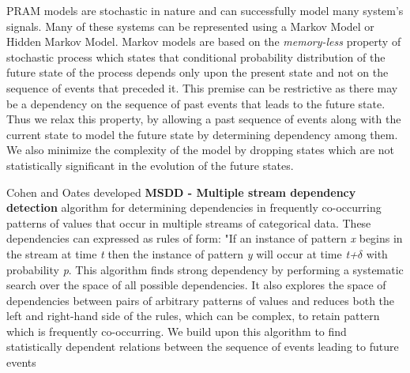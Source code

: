 \documentclass[11pt, a4paper]{article} %
\begin{document}
PRAM models are stochastic in nature and can successfully model many system's signals. Many of these systems can be represented using a Markov Model or Hidden Markov Model. Markov models are based on the \textit{memory-less} property of stochastic process which states that conditional probability distribution of the future state of the process depends only upon the present state and not on the sequence of events that preceded it. This premise can be restrictive as there may be a dependency on the sequence of past events that leads to the future state. Thus we relax this property, by allowing a past sequence of events along with the current state to model the future state by determining dependency among them. We also minimize the complexity of the model by dropping states which are not statistically significant in the evolution of the future states.

Cohen and Oates \cite{msdd} developed  \textbf{MSDD - Multiple stream dependency detection} algorithm for determining dependencies in frequently co-occurring patterns of values that occur in multiple streams of categorical data. These dependencies can expressed as rules of form: "If an instance of pattern \textit{x} begins in the stream at time \textit{t} then the instance of pattern \textit{y} will occur at time \textit{t+$\delta$ } with probability \textit{p}. This algorithm finds strong dependency by performing a systematic search over the space of all possible dependencies. It also explores the space of dependencies between pairs of arbitrary patterns of values and reduces both the left and right-hand side of the rules, which can be complex, to retain pattern which is frequently co-occurring. We build upon this algorithm to find statistically dependent relations between the sequence of events leading to future events
\end{document}

